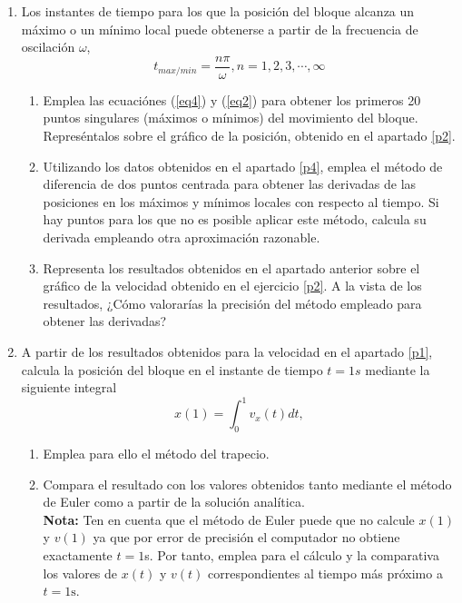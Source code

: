 \begin{enumerate}
\item Los instantes de tiempo para los que la posición del bloque alcanza un máximo o un mínimo local puede obtenerse a partir de la frecuencia de oscilación $\omega$,
\begin{equation}\label{eq4}
t_{max/min} = \frac{n \pi}{\omega}, n = 1,2,3,\cdots, \infty
\end{equation}
\begin{enumerate}
\item \label{p4}Emplea las ecuaciónes (\ref{eq4}) y (\ref{eq2}) para obtener los primeros 20 puntos singulares (máximos o mínimos) del movimiento del bloque. Represéntalos sobre el gráfico de la posición, obtenido en el apartado \ref{p2}.
\item Utilizando los datos obtenidos en el apartado \ref{p4}, emplea el método de diferencia de dos puntos centrada para obtener las derivadas de las posiciones en los máximos y mínimos locales con respecto al tiempo. Si hay puntos para los que no es posible aplicar este método, calcula su derivada empleando otra aproximación razonable.
 
\item Representa los resultados obtenidos en el apartado anterior sobre el gráfico de la velocidad obtenido en el ejercicio \ref{p2}. A la vista de los resultados, ¿Cómo valorarías la precisión del método empleado para obtener las derivadas? 
\end{enumerate}

\item A partir de los resultados obtenidos para la velocidad en el apartado \ref{p1}, calcula la posición del bloque en el instante de tiempo $t=1s$ mediante la siguiente integral
\begin{equation}
x(1) = \int_0^1v_x(t)dt,
\end{equation}
\begin{enumerate}
\item Emplea para ello el método del trapecio.
\item Compara el resultado con los valores obtenidos tanto mediante el método de Euler como a partir de la solución analítica.\\ 
\textbf{Nota:} Ten en cuenta que el método de Euler puede que no calcule $x(1)$ y $v(1)$ ya que por error de precisión el computador no obtiene exactamente $t=1$s. Por tanto, emplea para el cálculo y la comparativa los valores de $x(t)$ y $v(t)$ correspondientes al tiempo más próximo a $t=1\text{s}$.
\end{enumerate}
\end{enumerate}
